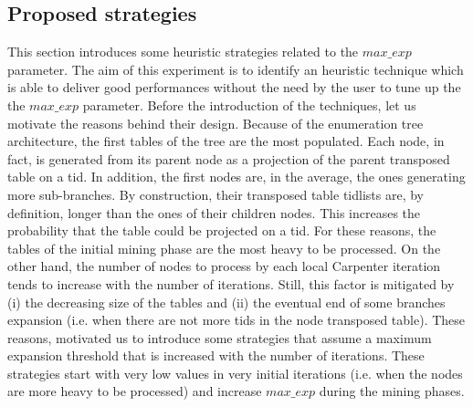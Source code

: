 \subsection{Proposed strategies}\label{exp_strategies}
This section introduces some heuristic strategies related to the $max\_exp$ parameter. 
The aim of this experiment is to identify an heuristic technique which is able to deliver good performances without the need by the user to tune up the the $max\_exp$ parameter.
Before the introduction of the techniques, let us motivate the reasons behind their design.
Because of the enumeration tree architecture, the first tables of the tree are the most populated. Each node, in fact, is generated from its parent node as a projection of the parent transposed table on a tid. 
In addition, the first nodes are, in the average, the ones generating more sub-branches. By construction, their transposed table tidlists are, by definition, longer than the ones of their children nodes. This increases the probability that the table could be projected on a tid.
For these reasons, the tables of the initial mining phase are the most heavy to be processed.
On the other hand, the number of nodes to process by each local Carpenter iteration tends to increase with the number of iterations. Still, this factor is mitigated by (i) the decreasing size of the tables and (ii) the eventual end of some branches expansion (i.e. when there are not more tids in the node transposed table).
These reasons, motivated us to introduce some strategies that assume a maximum expansion threshold that is increased with the number of iterations. These strategies start with very low values in very initial iterations  (i.e. when the nodes are more heavy to be processed) and increase $max\_exp$ during the mining phases.

